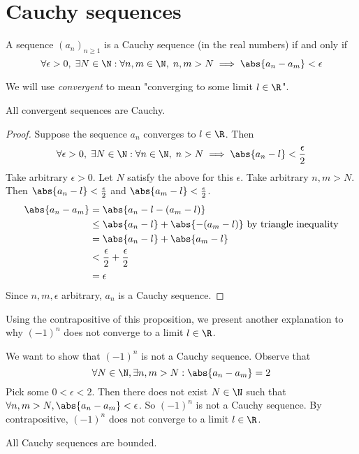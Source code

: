 \section{Cauchy sequences}
\begin{definition}
  A sequence $(a_n)_{n \geq 1}$ is a Cauchy sequence (in the real numbers) if and only if
  \[
    \forall \epsilon > 0, \; \exists N \in \N: \forall n, m \in \N, \; n, m > N \implies \abs{a_n - a_m} < \epsilon
  \]
\end{definition}
We will use \textit{convergent} to mean "converging to some limit $l \in \R$".
\begin{prop}
  \label{prop:convergent-cauchy}
  All convergent sequences are Cauchy.
\end{prop}
\begin{proof}
  Suppose the sequence $a_n$ converges to $l \in \R$. Then 
  \[
    \forall \epsilon > 0, \; \exists N \in \N: \forall n \in \N, \; n > N \implies \abs{a_n - l} < \frac{\epsilon}{2}
  \]
  Take arbitrary $\epsilon > 0$. Let $N$ satisfy the above for this $\epsilon$. Take arbitrary $n, m > N$. Then $\abs{a_n - l} < \frac{\epsilon}{2}$ and $\abs{a_m - l} < \frac{\epsilon}{2}$.
  \begin{align*}
    \abs{a_n - a_m} &= \abs{a_n - l - (a_m - l)} \\
    &\leq \abs{a_n - l} + \abs{-(a_m - l)} \ \text{by triangle inequality} \\
    &= \abs{a_n - l} + \abs{a_m - l} \\
    &< \frac{\epsilon}{2} + \frac{\epsilon}{2} \\
    &= \epsilon
  \end{align*}
  Since $n, m, \epsilon$ arbitrary, $a_n$ is a Cauchy sequence.
\end{proof}
Using the contrapositive of this proposition, we present another explanation to why $(-1)^n$ does not converge to a limit $l \in \R$.
\begin{explanation}
  We want to show that $(-1)^n$ is not a Cauchy sequence.
  Observe that
  \[
    \forall N \in \N, \exists n, m > N: \abs{a_n - a_m} = 2
  \]
  Pick some $0 < \epsilon < 2$. Then there does not exist $N \in \N$ such that $\forall n, m > N, \abs{a_n - a_m} < \epsilon$. So $(-1)^n$ is not a Cauchy sequence. By contrapositive, $(-1)^n$ does not converge to a limit $l \in \R$.
\end{explanation}
\begin{prop}
  \label{prop:cauchy-bounded}
  All Cauchy sequences are bounded.
\end{prop}
